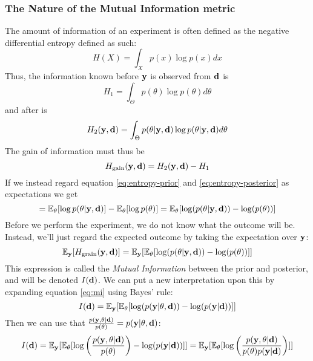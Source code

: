 \subsubsection{The Nature of the Mutual Information metric}
The amount of information of an experiment is often defined as the negative differential entropy defined as such\cite{lindley56}:
\begin{equation}H(X) = \int_{X}p(x)\log p(x)dx\end{equation}
Thus, the information known before $\mathbf{y}$ is observed from $\mathbf{d}$ is
\begin{equation}\label{eq:entropy-prior}H_1 = \int_{\Theta}p(\theta)\log p(\theta)d\theta\end{equation}
and after is
\begin{equation}\label{eq:entropy-posterior}H_2(\mathbf{y}, \mathbf{d}) = \int_{\Theta}p(\theta| \mathbf{y}, \mathbf{d})\log p(\theta| \mathbf{y}, \mathbf{d})d\theta\end{equation}
The gain of information must thus be
\begin{equation}H_\textrm{gain}(\mathbf{y}, \mathbf{d}) = H_2(\mathbf{y}, \mathbf{d}) - H_1\end{equation}
If we instead regard equation \ref{eq:entropy-prior} and \ref{eq:entropy-posterior} as expectations we get
\begin{equation} = \mathbb{E}_\theta[\log p(\theta | \mathbf{y}, \mathbf{d})] - \mathbb{E}_\theta [\log p(\theta )]  = \mathbb{E}_\theta [\log(p(\theta | \mathbf{y}, \mathbf{d})) - \log(p(\theta))]\end{equation}
Before we perform the experiment, we do not know what the outcome will be. Instead, we'll just regard the expected outcome by taking the expectation over $\mathbf{y}$:
\begin{equation} \label{eq:mi}\mathbb{E}_{\mathbf{y}}[H_\textrm{grain}(\mathbf{y}, \mathbf{d})]  = \mathbb{E}_{\mathbf{y}}[\mathbb{E}_\theta [\log(p(\theta | \mathbf{y}, \mathbf{d})) - \log(p(\theta))]]\end{equation}
This expression is called the \textit{Mutual Information} between the prior and posterior, and will be denoted $I(\mathbf{d})$.
We can put a new interpretation upon this by expanding equation \ref{eq:mi} using Bayes' rule:
\begin{equation} I(\mathbf{d})  = \mathbb{E}_{\mathbf{y}}[\mathbb{E}_\theta [\log(p(\mathbf{y} | \mathbf{\theta}, \mathbf{d})) - \log(p(\mathbf{y}|\mathbf{d}))]]\end{equation}
Then we can use that $\frac{p(\mathbf{y}, \mathbf{\theta}|\mathbf{d})}{p(\theta)}=p(\mathbf{y| \theta, \mathbf{d}})$:
\begin{equation} I(\mathbf{d})  = \mathbb{E}_{\mathbf{y}}[\mathbb{E}_\theta [\log\left(\frac{p(\mathbf{y}, \mathbf{\theta}|\mathbf{d})}{p(\theta)}\right) - \log(p(\mathbf{y}|\mathbf{d}))]] = \mathbb{E}_{\mathbf{y}}[\mathbb{E}_\theta [\log\left(\frac{p(\mathbf{y}, \mathbf{\theta}|\mathbf{d})}{p(\theta)p(\mathbf{y}|\mathbf{d})}\right)]]\end{equation}
